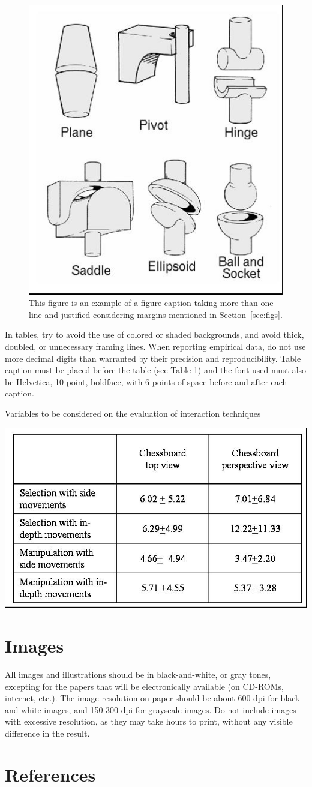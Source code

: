 \documentclass[12pt]{article}
\begin{document}
\begin{figure}[ht]
\centering
\includegraphics[width=.3\textwidth]{fig2.jpg}
\caption{This figure is an example of a figure caption taking more than one
  line and justified considering margins mentioned in Section~\ref{sec:figs}.}
\label{fig:exampleFig2}
\end{figure}

In tables, try to avoid the use of colored or shaded backgrounds, and avoid
thick, doubled, or unnecessary framing lines. When reporting empirical data,
do not use more decimal digits than warranted by their precision and
reproducibility. Table caption must be placed before the table (see Table 1)
and the font used must also be Helvetica, 10 point, boldface, with 6 points of
space before and after each caption.

\begin{table}[ht]
\centering
\caption{Variables to be considered on the evaluation of interaction
  techniques}
\label{tab:exTable1}
\includegraphics[width=.7\textwidth]{table.jpg}
\end{table}

\section{Images}

All images and illustrations should be in black-and-white, or gray tones,
excepting for the papers that will be electronically available (on CD-ROMs,
internet, etc.). The image resolution on paper should be about 600 dpi for
black-and-white images, and 150-300 dpi for grayscale images.  Do not include
images with excessive resolution, as they may take hours to print, without any
visible difference in the result. 

\section{References}
%
%

%
%

\end{document}
